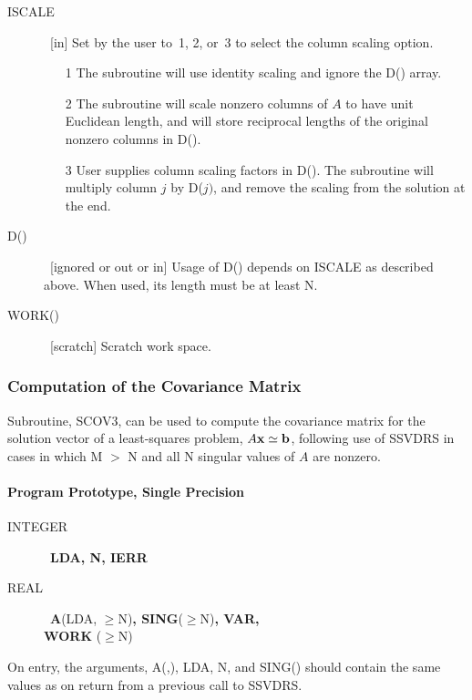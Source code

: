\documentclass[twoside]{MATH77}
\begin{document}
\begin{description}
\item[ISCALE]  \ [in] Set by the user to~1, 2, or~3 to select the column
scaling option.

\begin{itemize}
\item[1]  The subroutine will use identity scaling and ignore the D() array.

\item[2]  The subroutine will scale nonzero columns of $A$ to have unit
Euclidean length, and will store reciprocal lengths of the original nonzero
columns in D().

\item[3]  User supplies column scaling factors in D(). The subroutine will
multiply column $j$ by D($j)$, and remove the scaling from the solution at
the end.
\end{itemize}

\item[D()]  \ [ignored or out or in] Usage of D() depends on ISCALE as
described above. When used, its length must be at least N.

\item[WORK()]  \ [scratch] Scratch work space.
\end{description}

\subsubsection{Computation of the Covariance Matrix}

Subroutine, SCOV3, can be used to compute the covariance matrix for the
solution vector of a least-squares problem, $A{\bf x} \simeq {\bf b}$,
following use of SSVDRS in cases in which M $>$ N and all N singular values
of $A$ are nonzero.

\paragraph{Program Prototype, Single Precision}

\begin{description}
\item[INTEGER]  \ {\bf LDA, N, IERR}

\item[REAL]  \ {\bf A}(LDA, $\geq $N){\bf , SING}($\geq $N){\bf , VAR,\\ WORK%
}($\geq $N)
\end{description}

On entry, the arguments, A(,), LDA, N, and SING() should contain the same
values as on return from a previous call to SSVDRS.
\end{document}

